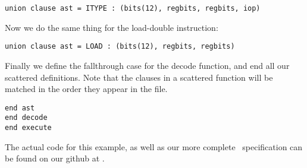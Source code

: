 \begin{lstlisting}
union clause ast = ITYPE : (bits(12), regbits, regbits, iop)
\end{lstlisting}

\sailfndecodeSomeITYPE
\sailfnexecuteITYPE

\noindent Now we do the same thing for the load-double instruction:

\begin{lstlisting}
union clause ast = LOAD : (bits(12), regbits, regbits)
\end{lstlisting}

\sailfndecodeSomeLOAD
\sailfnexecuteLOAD

Finally we define the fallthrough case for the decode function, and
end all our scattered definitions. Note that the clauses in a
scattered function will be matched in the order they appear in the
file.

\sailfndecodeNone

\begin{lstlisting}
end ast
end decode
end execute
\end{lstlisting}

The actual code for this example, as well as our more complete
\riscv\ specification can be found on our github at
.
